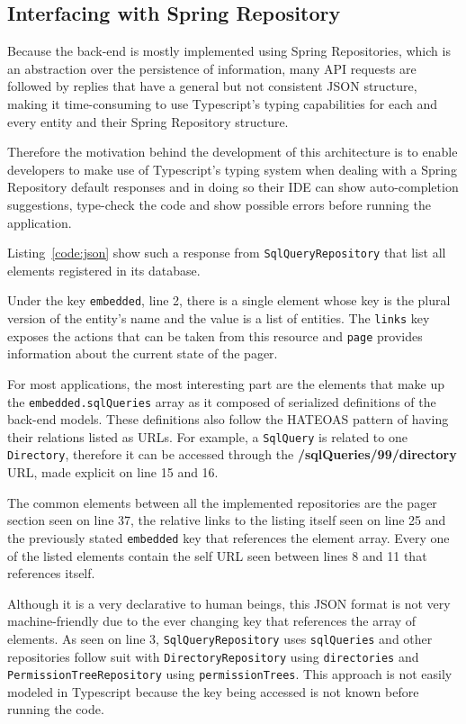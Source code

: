 \subsection{Interfacing with Spring Repository}\label{f:isr}
Because the back-end is mostly implemented using Spring Repositories, which is an abstraction over the persistence of information, many \gls{API} requests are followed by replies that have a general but not consistent \gls{JSON} structure, making it time-consuming to use Typescript's typing capabilities for each and every entity and their Spring Repository structure.

Therefore the motivation behind the development of this architecture is to enable developers to make use of Typescript's typing system when dealing with a Spring Repository default responses and in doing so their \gls{IDE} can show auto-completion suggestions, type-check the code and show possible errors before running the application.

Listing~\ref{code:json} show such a response from \texttt{SqlQueryRepository} that list all elements registered in its database.

Under the key \texttt{\textunderscore embedded}, line 2, there is a single element whose key is the plural version of the entity's name and the value is a list of entities. The \texttt{\textunderscore links} key exposes the actions that can be taken from this resource and \texttt{page} provides information about the current state of the pager.

For most applications, the most interesting part are the elements that make up the \texttt{\textunderscore embedded.sqlQueries} array as it composed of serialized definitions of the back-end models. These definitions also follow the \gls{HATEOAS} pattern of having their relations listed as \gls{URL}s. For example, a \texttt{SqlQuery} is related to one \texttt{Directory},  therefore it can be accessed through the \textbf{/sqlQueries/99/directory} \gls{URL}, made explicit on line 15 and 16.

The common elements between all the implemented repositories are the pager section seen on line 37, the relative links to the listing itself seen on line 25 and the previously stated \texttt{\textunderscore embedded} key that references the element array. Every one of the listed elements contain the self \gls{URL} seen between lines 8 and 11 that references itself.

Although it is a very declarative to human beings, this \gls{JSON} format is not very machine-friendly due to the ever changing key that references the array of elements. As seen on line 3, \texttt{SqlQueryRepository} uses \texttt{sqlQueries} and other repositories follow suit with \texttt{DirectoryRepository} using \texttt{directories} and \texttt{PermissionTreeRepository} using \texttt{permissionTrees}. This approach is not easily modeled in Typescript because the key being accessed is not known before running the code. 

